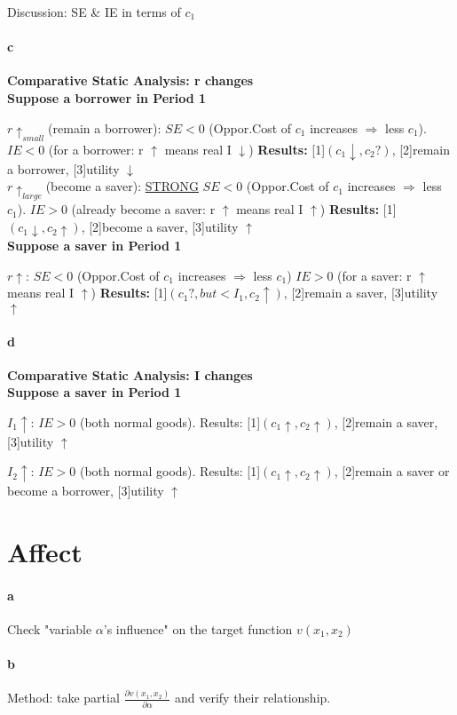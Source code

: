 \documentclass{article} %
\begin{document}
    Discussion: SE \& IE in terms of $c_1$
\paragraph{c}
    {\bf Comparative Static Analysis: r changes}
\\

    {\bf Suppose a borrower in Period 1} 
    
    $r \uparrow _{small}$(remain a borrower): $SE<0$ (Oppor.Cost of $c_1$ increases $\Rightarrow$ less $c_1$). $IE<0$ (for a borrower: r $\uparrow$ means real I $\downarrow$) {\bf Results:} [1]$(c_1\downarrow, c_2?)$, [2]remain a borrower, [3]utility $\downarrow$
\\
    
    $r \uparrow _{large}$(become a saver): \underline{STRONG} $SE<0$ (Oppor.Cost of $c_1$ increases $\Rightarrow$ less $c_1$). $IE>0$ (already become a saver: r $\uparrow$ means real I $\uparrow$) {\bf Results:} [1]$(c_1\downarrow, c_2\uparrow)$, [2]become a saver, [3]utility $\uparrow$
    \\   
    
    
    {\bf Suppose a saver in Period 1} 
    
    $r \uparrow$: $SE<0$ (Oppor.Cost of $c_1$ increases $\Rightarrow$ less $c_1$) $IE>0$ (for a saver: r $\uparrow$ means real I $\uparrow$) {\bf Results:} [1]$(c_1?, but <I_1, c_2\uparrow)$, [2]remain a saver, [3]utility $\uparrow$

\paragraph{d}  
    {\bf Comparative Static Analysis: I changes}
\\    
    
    {\bf Suppose a saver in Period 1}
    
    $I_1 \uparrow$: $IE>0$ (both normal goods). Results: [1]$(c_1\uparrow, c_2\uparrow)$, [2]remain a saver, [3]utility $\uparrow$
    
    $I_2 \uparrow$: $IE>0$ (both normal goods). Results: [1]$(c_1\uparrow, c_2\uparrow)$, [2]remain a saver or become a borrower, [3]utility $\uparrow$ 
    \\
\section{Affect}
\paragraph{a}
    Check "variable $\alpha$'s influence" on the target function $v(x_1, x_2)$  
\paragraph{b}    
    Method: take partial $\frac{\partial v(x_1, x_2)}{\partial \alpha}$ and verify their relationship.
\end{document}
